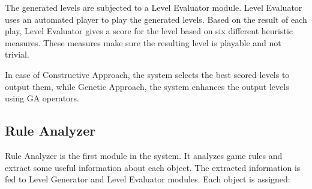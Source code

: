 The generated levels are subjected to a Level Evaluator module. Level Evaluator uses an automated player to play the generated levels. Based on the result of each play, Level Evaluator gives a score for the level based on six different heuristic measures. These measures make sure the resulting level is playable and not trivial.\\\par

In case of Constructive Approach, the system selects the best scored levels to output them, while Genetic Approach, the system enhances the output levels using GA operators.

\subsection{Rule Analyzer}
Rule Analyzer is the first module in the system. It analyzes game rules and extract some useful information about each object. The extracted information is fed to Level Generator and Level Evaluator modules. Each object is assigned:

